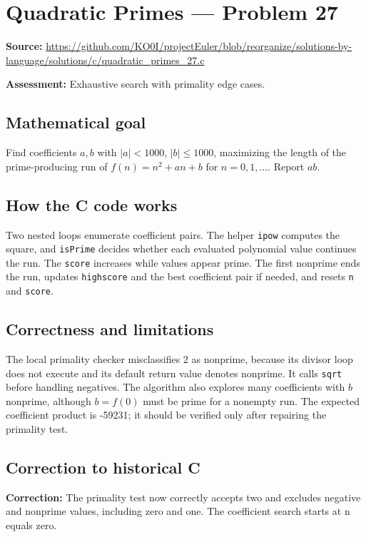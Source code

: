 \section{Quadratic Primes --- Problem 27}
\label{prob:27}
\noindent\textbf{Source:} \url{https://github.com/KO0I/projectEuler/blob/reorganize/solutions-by-language/solutions/c/quadratic_primes_27.c}

\noindent\textbf{Assessment:} Exhaustive search with primality edge cases.

\subsection*{Mathematical goal}
Find coefficients \(a,b\) with \(|a|<1000\), \(|b|\leq1000\), maximizing the length of the prime-producing run of \(f(n)=n^2+an+b\) for \(n=0,1,\ldots\). Report \(ab\).

\subsection*{How the C code works}
Two nested loops enumerate coefficient pairs. The helper \verb|ipow| computes the square, and \verb|isPrime| decides whether each evaluated polynomial value continues the run. The \verb|score| increases while values appear prime. The first nonprime ends the run, updates \verb|highscore| and the best coefficient pair if needed, and resets \verb|n| and \verb|score|.

\subsection*{Correctness and limitations}
The local primality checker misclassifies 2 as nonprime, because its divisor loop does not execute and its default return value denotes nonprime. It calls \verb|sqrt| before handling negatives. The algorithm also explores many coefficients with \(b\) nonprime, although \(b=f(0)\) must be prime for a nonempty run. The expected coefficient product is -59231; it should be verified only after repairing the primality test.


\subsection*{Correction to historical C}
{\color{red}\textbf{Correction:} The primality test now correctly accepts two and excludes negative and nonprime values, including zero and one. The coefficient search starts at n equals zero.}
